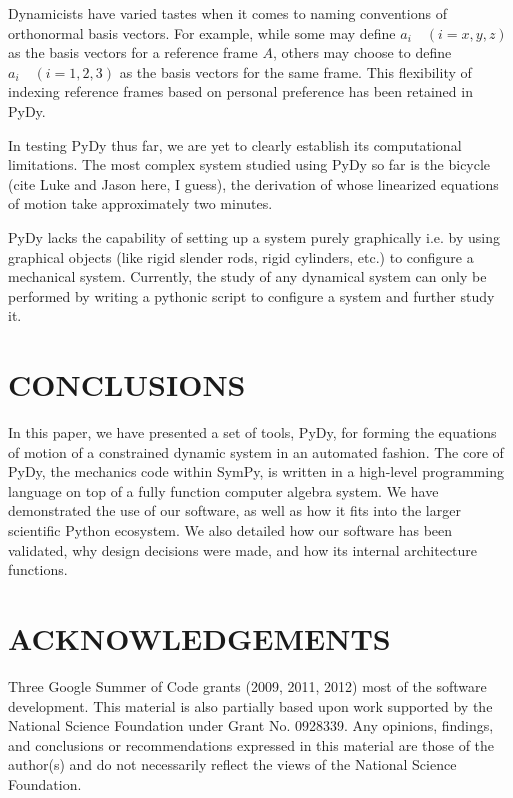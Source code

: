 \documentclass[twocolumn,10pt]{asme2e}
\begin{document}
Dynamicists have varied tastes when it comes to naming conventions of
orthonormal basis vectors. For example, while some may define $a_i
\quad (i=x,y,z)$ as the basis vectors for a reference frame $A$, others may
choose to define $a_i \quad (i=1,2,3)$ as the basis vectors for the same frame.
This flexibility of indexing reference frames based on personal preference has
been retained in PyDy.

In testing PyDy thus far, we are yet to clearly establish its computational
limitations. The most complex system studied using PyDy so far is the bicycle
(cite Luke and Jason here, I guess), the derivation of whose linearized
equations of motion take approximately two minutes.

PyDy lacks the capability of setting up a system purely graphically i.e. by
using graphical objects (like rigid slender rods, rigid cylinders, etc.) to
configure a mechanical system. Currently, the study of any dynamical system
can only be performed by writing a pythonic script to configure a system and
further study it.


\section*{CONCLUSIONS}
In this paper, we have presented a set of tools, PyDy, for forming the
equations of motion of a constrained dynamic system in an automated fashion.
The core of PyDy, the mechanics code within SymPy, is written in a high-level
programming language on top of a fully function computer algebra system.
We have demonstrated the use of our software, as well as how it fits into the
larger scientific Python ecosystem.
We also detailed how our software has been validated, why design decisions were
made, and how its internal architecture functions.

\section*{ACKNOWLEDGEMENTS}
Three Google Summer of Code grants (2009, 2011, 2012) most of the software
development. This material is also partially based upon work supported by the
National Science Foundation under Grant No. 0928339. Any opinions, findings,
and conclusions or recommendations expressed in this material are those of the
author(s) and do not necessarily reflect the views of the National Science
Foundation.


\end{document}
